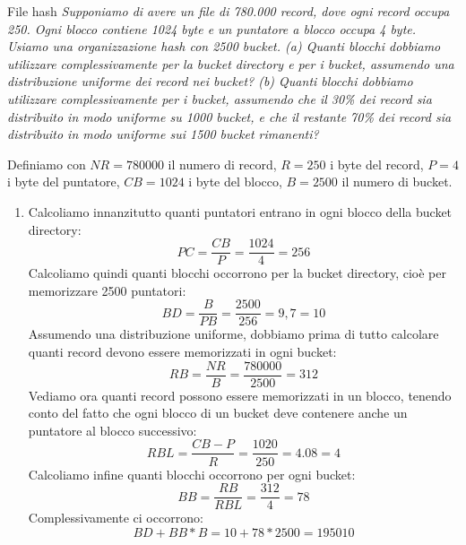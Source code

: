 \begin{Example}{File hash}{}
    \textit{Supponiamo di avere un file di 780.000 record, dove ogni record occupa 250. Ogni blocco contiene 1024 byte e un puntatore a blocco occupa 4 byte. Usiamo una organizzazione hash con 2500 bucket. (a) Quanti blocchi dobbiamo utilizzare complessivamente per la bucket directory e per i bucket, assumendo una distribuzione uniforme dei record nei bucket? (b) Quanti blocchi dobbiamo utilizzare complessivamente per i bucket, assumendo che il 30\% dei record sia distribuito in modo uniforme su 1000 bucket, e che il restante 70\% dei record sia distribuito in modo uniforme sui 1500 bucket rimanenti?}

    Definiamo con $NR=780000$ il numero di record, $R=250$ i byte del record, $P=4$ i byte del puntatore, $CB=1024$ i byte del blocco, $B=2500$ il numero di bucket.
    \begin{enumerate}[label=(\alph*)]
        \item Calcoliamo innanzitutto quanti puntatori entrano in ogni blocco della bucket directory:
        \begin{equation*}
            PC=\frac{CB}{P}=\frac{1024}{4}=256
        \end{equation*}
        Calcoliamo quindi quanti blocchi occorrono per la bucket directory, cioè per memorizzare 2500 puntatori:
        \begin{equation*}
            BD=\frac{B}{PB}=\frac{2500}{256}=9,7=10
        \end{equation*}
        Assumendo una distribuzione uniforme, dobbiamo prima di tutto calcolare quanti record devono essere memorizzati in ogni bucket:
        \begin{equation*}
            RB=\frac{NR}{B}=\frac{780000}{2500}=312
        \end{equation*}
        Vediamo ora quanti record possono essere memorizzati in un blocco, tenendo conto del fatto che ogni blocco di un bucket deve contenere anche un puntatore al blocco successivo:
        \begin{equation*}
            RBL=\frac{CB-P}{R}=\frac{1020}{250}=4.08=4
        \end{equation*}
        Calcoliamo infine quanti blocchi occorrono per ogni bucket:
        \begin{equation*}
            BB=\frac{RB}{RBL}=\frac{312}{4}=78
        \end{equation*}
        Complessivamente ci occorrono:
        \begin{equation*}
            BD + BB * B = 10 + 78 * 2500 = 195010
        \end{equation*}


\end{enumerate}
\end{Example}
